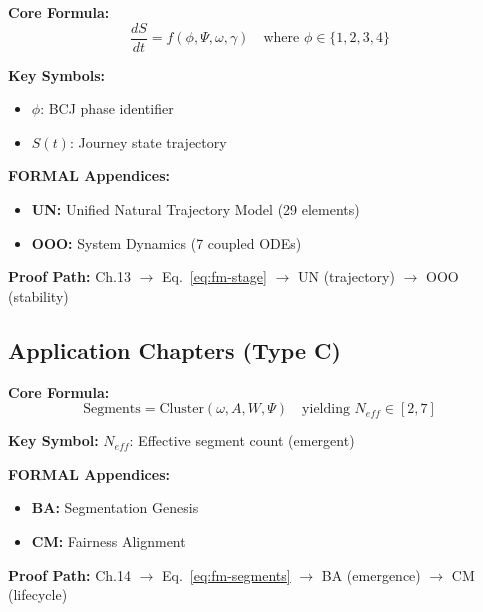 \begin{tcolorbox}[colback=blue!3!white, colframe=blue!60!black,
    title=\textbf{Chapter 13: STAGE (Behavioral Change Journey)}]

\textbf{Core Formula:}
\begin{equation}
\frac{dS}{dt} = f(\phi, \Psi, \omega, \gamma) \quad \text{where } \phi \in \{1, 2, 3, 4\}
\label{eq:fm-stage}
\end{equation}

\textbf{Key Symbols:}
\begin{itemize}[nosep]
    \item $\phi$: BCJ phase identifier
    \item $S(t)$: Journey state trajectory
\end{itemize}

\textbf{FORMAL Appendices:}
\begin{itemize}[nosep]
    \item \textbf{UN:} Unified Natural Trajectory Model (29 elements)
    \item \textbf{OOO:} System Dynamics (7 coupled ODEs)
\end{itemize}

\textbf{Proof Path:} Ch.13 $\rightarrow$ Eq.~\ref{eq:fm-stage} $\rightarrow$ UN (trajectory) $\rightarrow$ OOO (stability)

\end{tcolorbox}

\subsection{Application Chapters (Type C)}

\begin{tcolorbox}[colback=green!3!white, colframe=green!60!black,
    title=\textbf{Chapter 14: Behavioral Change Segments}]

\textbf{Core Formula:}
\begin{equation}
\text{Segments} = \text{Cluster}(\omega, A, W, \Psi) \quad \text{yielding } N_{eff} \in [2, 7]
\label{eq:fm-segments}
\end{equation}

\textbf{Key Symbol:} $N_{eff}$: Effective segment count (emergent)

\textbf{FORMAL Appendices:}
\begin{itemize}[nosep]
    \item \textbf{BA:} Segmentation Genesis
    \item \textbf{CM:} Fairness Alignment
\end{itemize}

\textbf{Proof Path:} Ch.14 $\rightarrow$ Eq.~\ref{eq:fm-segments} $\rightarrow$ BA (emergence) $\rightarrow$ CM (lifecycle)

\end{tcolorbox}

